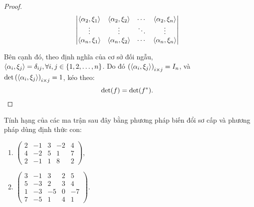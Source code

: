 \documentclass[class=nhvh-linear-algebra,crop=false]{standalone}
\begin{document}
\begin{proof}
\[\begin{vmatrix}
            \left\langle{\alpha_{2},\xi_{1}}\right\rangle & \left\langle{\alpha_{2},\xi_{2}}\right\rangle & \cdots & \left\langle{\alpha_{2},\xi_{n}}\right\rangle \\
            \vdots                       & \vdots                       & \ddots & \vdots                       \\
            \left\langle{\alpha_{n},\xi_{1}}\right\rangle & \left\langle{\alpha_{n},\xi_{2}}\right\rangle & \cdots & \left\langle{\alpha_{n},\xi_{n}}\right\rangle \\
        \end{vmatrix}
    \]
    \par Bên cạnh đó, theo định nghĩa của cơ sở đối ngẫu, $\left\langle{\alpha_{i}, \xi_{j}}\right\rangle = \delta_{ij}, \forall i, j\in \{ 1, 2, \ldots, n \}$. Do đó ${(\left\langle{\alpha_{i}, \xi_{j}}\right\rangle)}_{i\times j} = I_{n}$, và $\det{(\left\langle{\alpha_{i}, \xi_{j}}\right\rangle)}_{i\times j} = 1$, kéo theo:
    \[
        \det(f) = \det(f^{*}).\qedhere
    \]
    \endgroup{}
\end{proof}

\begin{exercise}
    \par Tính hạng của các ma trận sau đây bằng phương pháp biến đổi sơ cấp và phương pháp dùng định thức con:
    \begin{enumerate}[label = (\alph*)]
        \item $
                  \begin{pmatrix}
                      2 & -1 & 3 & -2 & 4 \\
                      4 & -2 & 5 & 1  & 7 \\
                      2 & -1 & 1 & 8  & 2
                  \end{pmatrix}
              $,
        \item $
                  \begin{pmatrix}
                      3 & -1 & 3  & 2 & 5  \\
                      5 & -3 & 2  & 3 & 4  \\
                      1 & -3 & -5 & 0 & -7 \\
                      7 & -5 & 1  & 4 & 1
                  \end{pmatrix}
              $.
    \end{enumerate}
\end{exercise}
\end{document}
